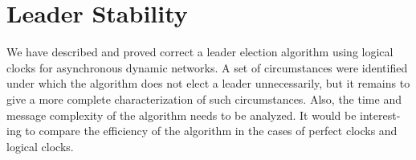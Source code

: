 \chapter{Leader Stability}

We have described and proved correct a leader election
algorithm using logical clocks for asynchronous dynamic
networks. A set of circumstances were identified under
which the algorithm does not elect a leader unnecessarily,
but it remains to give a more complete characterization of
such circumstances. Also, the time and message complexity
of the algorithm needs to be analyzed. It would be interest-
ing to compare the efficiency of the algorithm in the cases
of perfect clocks and logical clocks.